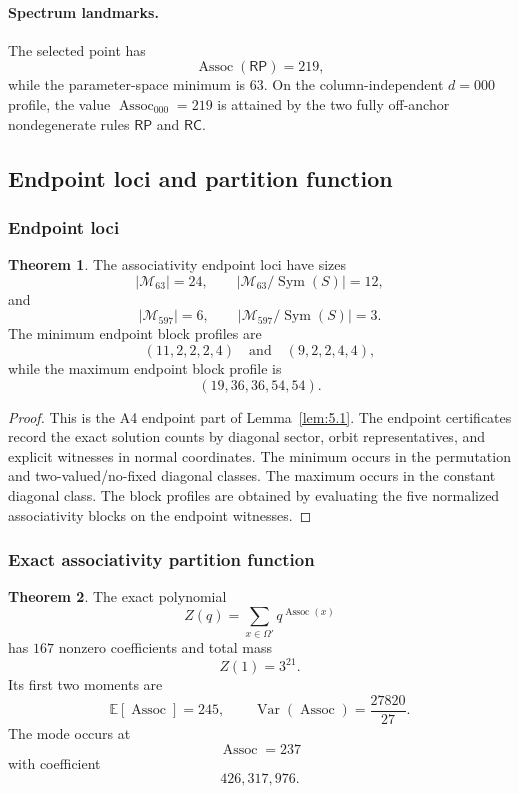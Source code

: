 \documentclass[11pt]{article}
\theoremstyle{definition}
\newtheorem{theorem}{Theorem}[section]
\newcommand{\RP}{\mathsf{RP}}
\newcommand{\RC}{\mathsf{RC}}
\begin{document}
\paragraph{Spectrum landmarks.}\label{global-and-local-associativity-roles}
The selected point has \[
\operatorname{Assoc}(\RP)=219,
\]
while the parameter-space minimum is \(63\).  On the column-independent \(d=000\)
profile, the value \(\operatorname{Assoc}_{000}=219\) is attained by the
two fully off-anchor nondegenerate rules \(\RP\) and \(\RC\).

\subsection{Endpoint loci and partition function}\label{assoc-endpoints-partition}\label{endpoint-loci-and-partition-function}

\subsubsection{Endpoint loci}\label{endpoint-loci}

\begin{theorem}
\label{thm:6.1}
The associativity endpoint loci have sizes \[
|\mathcal M_{63}|=24,
\qquad
|\mathcal M_{63}/\operatorname{Sym}(S)|=12,
\] and \[
|\mathcal M_{597}|=6,
\qquad
|\mathcal M_{597}/\operatorname{Sym}(S)|=3.
\] The minimum endpoint block profiles are \[
(11,2,2,2,4)
\quad\text{and}\quad
(9,2,2,4,4),
\] while the maximum endpoint block profile is \[
(19,36,36,54,54).
\]
\end{theorem}

\begin{proof}
This is the A4 endpoint part of Lemma~\ref{lem:5.1}. The endpoint
certificates record the exact solution counts by diagonal sector, orbit
representatives, and explicit witnesses in normal coordinates. The
minimum occurs in the permutation and two-valued/no-fixed diagonal
classes. The maximum occurs in the constant diagonal class. The block
profiles are obtained by evaluating the five normalized associativity
blocks on the endpoint witnesses.
\end{proof}

\subsubsection{Exact associativity partition function}\label{exact-associativity-partition-function}

\begin{theorem}
\label{thm:6.2}
The exact polynomial \[
Z(q)=\sum_{x\in\Omega'}q^{\operatorname{Assoc}(x)}
\] has \(167\) nonzero coefficients and total mass \[
Z(1)=3^{21}.
\] Its first two moments are \[
\mathbb E[\operatorname{Assoc}]=245,
\qquad
\operatorname{Var}(\operatorname{Assoc})=\frac{27820}{27}.
\] The mode occurs at \[
\operatorname{Assoc}=237
\] with coefficient \[
426,317,976.
\]
\end{theorem}
\end{document}
